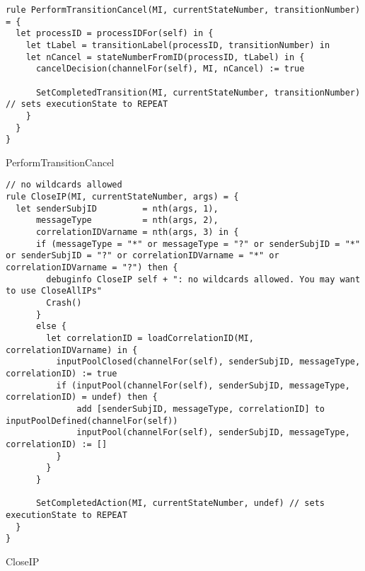 \begin{listing}[H]
\begin{verbatim}
rule PerformTransitionCancel(MI, currentStateNumber, transitionNumber) = {
  let processID = processIDFor(self) in {
    let tLabel = transitionLabel(processID, transitionNumber) in
    let nCancel = stateNumberFromID(processID, tLabel) in {
      cancelDecision(channelFor(self), MI, nCancel) := true

      SetCompletedTransition(MI, currentStateNumber, transitionNumber) // sets executionState to REPEAT
    }
  }
}
\end{verbatim}
\caption{PerformTransitionCancel}
\label{lst:asm:PerformTransitionCancel}
\end{listing}






\begin{listing}[H]
\begin{verbatim}
// no wildcards allowed
rule CloseIP(MI, currentStateNumber, args) = {
  let senderSubjID         = nth(args, 1),
      messageType          = nth(args, 2),
      correlationIDVarname = nth(args, 3) in {
      if (messageType = "*" or messageType = "?" or senderSubjID = "*" or senderSubjID = "?" or correlationIDVarname = "*" or correlationIDVarname = "?") then {
        debuginfo CloseIP self + ": no wildcards allowed. You may want to use CloseAllIPs"
        Crash()
      }
      else {
        let correlationID = loadCorrelationID(MI, correlationIDVarname) in {
          inputPoolClosed(channelFor(self), senderSubjID, messageType, correlationID) := true
          if (inputPool(channelFor(self), senderSubjID, messageType, correlationID) = undef) then {
              add [senderSubjID, messageType, correlationID] to inputPoolDefined(channelFor(self))
              inputPool(channelFor(self), senderSubjID, messageType, correlationID) := []
          }
        }
      }

      SetCompletedAction(MI, currentStateNumber, undef) // sets executionState to REPEAT
  }
}
\end{verbatim}
\caption{CloseIP}
\label{lst:asm:CloseIP}
\end{listing}




